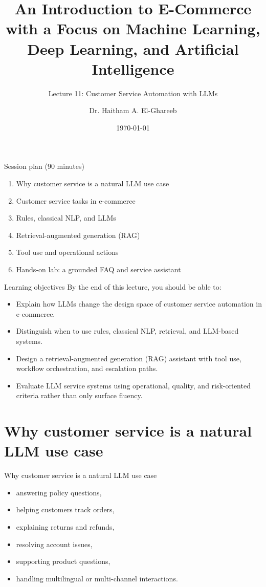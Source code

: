 \documentclass[aspectratio=169]{beamer}
\title[Lecture 11]{An Introduction to E-Commerce\\\small with a Focus on Machine Learning, Deep Learning, and Artificial Intelligence}
\subtitle{Lecture 11: Customer Service Automation with LLMs}
\author{Dr. Haitham A. El-Ghareeb}
\institute{Faculty of Computers and Information Sciences \\ Mansoura University \\ Egypt}
\date{\today}
\begin{document}
\begin{frame}
  \titlepage
\end{frame}

\begin{frame}{Session plan (90 minutes)}
  \begin{enumerate}
    \item Why customer service is a natural LLM use case
    \item Customer service tasks in e-commerce
    \item Rules, classical NLP, and LLMs
    \item Retrieval-augmented generation (RAG)
    \item Tool use and operational actions
    \item Hands-on lab: a grounded FAQ and service assistant
  \end{enumerate}
\end{frame}

\begin{frame}{Learning objectives}
  By the end of this lecture, you should be able to:
  \begin{itemize}
    \item Explain how LLMs change the design space of customer service automation in e-commerce.
    \item Distinguish when to use rules, classical NLP, retrieval, and LLM-based systems.
    \item Design a retrieval-augmented generation (RAG) assistant with tool use, workflow orchestration, and escalation paths.
    \item Evaluate LLM service systems using operational, quality, and risk-oriented criteria rather than only surface fluency.
  \end{itemize}
\end{frame}

\section{Why customer service is a natural LLM use case}

\begin{frame}{Why customer service is a natural LLM use case}
  \begin{itemize}
    \item answering policy questions,
    \item helping customers track orders,
    \item explaining returns and refunds,
    \item resolving account issues,
    \item supporting product questions,
    \item handling multilingual or multi-channel interactions.
  \end{itemize}
\end{frame}
\end{document}
